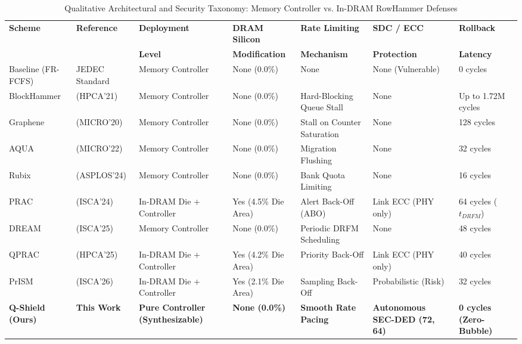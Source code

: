 \begin{table}[t]
\centering
\small
\caption{Qualitative Architectural and Security Taxonomy: Memory Controller vs. In-DRAM RowHammer Defenses}
\label{tab:architectural_taxonomy}
\begin{tabular}{lllp{3.2cm}lp{3.5cm}l}
\toprule
\textbf{Scheme} & \textbf{Reference} & \textbf{Deployment} & \textbf{DRAM Silicon} & \textbf{Rate Limiting} & \textbf{SDC / ECC} & \textbf{Rollback} \\
 & & \textbf{Level} & \textbf{Modification} & \textbf{Mechanism} & \textbf{Protection} & \textbf{Latency} \\
\midrule
Baseline (FR-FCFS) & JEDEC Standard & Memory Controller & None (0.0\%) & None & None (Vulnerable) & 0 cycles \\
BlockHammer & \cite{segal2021blockhammer} (HPCA'21) & Memory Controller & None (0.0\%) & Hard-Blocking Queue Stall & None & Up to 1.72M cycles \\
Graphene & \cite{park2020graphene} (MICRO'20) & Memory Controller & None (0.0\%) & Stall on Counter Saturation & None & 128 cycles \\
AQUA & \cite{park2022aqua} (MICRO'22) & Memory Controller & None (0.0\%) & Migration Flushing & None & 32 cycles \\
Rubix & \cite{saxena2024rubix} (ASPLOS'24) & Memory Controller & None (0.0\%) & Bank Quota Limiting & None & 16 cycles \\
PRAC & \cite{yaglikci2024prac} (ISCA'24) & In-DRAM Die + Controller & Yes (4.5\% Die Area) & Alert Back-Off (ABO) & Link ECC (PHY only) & 64 cycles ($t_{DRFM}$) \\
DREAM & \cite{dream2025} (ISCA'25) & Memory Controller & None (0.0\%) & Periodic DRFM Scheduling & None & 48 cycles \\
QPRAC & \cite{woo2025qprac} (HPCA'25) & In-DRAM Die + Controller & Yes (4.2\% Die Area) & Priority Back-Off & Link ECC (PHY only) & 40 cycles \\
PrISM & \cite{prism2026} (ISCA'26) & In-DRAM Die + Controller & Yes (2.1\% Die Area) & Sampling Back-Off & Probabilistic (Risk) & 32 cycles \\
\textbf{Q-Shield (Ours)} & \textbf{This Work} & \textbf{Pure Controller (Synthesizable)} & \textbf{None (0.0\%)} & \textbf{Smooth Rate Pacing} & \textbf{Autonomous SEC-DED (72, 64)} & \textbf{0 cycles (Zero-Bubble)} \\
\bottomrule
\end{tabular}
\end{table}
